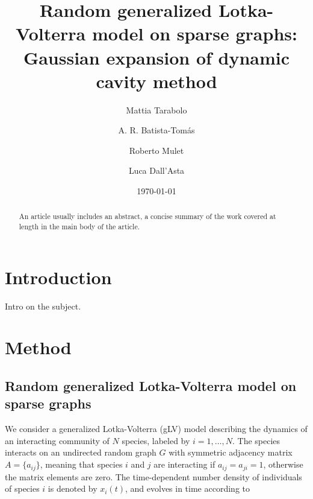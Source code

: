 \documentclass[
    preprint,
    linenumbers,
    amsmath,amssymb,amsfonts,
    aps, physrev,
    superscriptaddress,
    10pt,
    bibnotes
    ]{revtex4-2}
\begin{document}
\title{Random generalized Lotka-Volterra model on sparse graphs:\\
Gaussian expansion of dynamic cavity method}

\author{Mattia Tarabolo}

\author{A. R. Batista-Tomás}

\author{Roberto Mulet}

\author{Luca Dall'Asta}

\date{\today}

\begin{abstract}
An article usually includes an abstract, a concise summary of the
work covered at length in the main body of the article. 
\end{abstract}

\maketitle

\section{\label{sec:intro}Introduction}

Intro on the subject.

\section{Method}

\subsection{Random generalized Lotka-Volterra model on sparse graphs}

We consider a generalized Lotka-Volterra (gLV) model describing the dynamics
of an interacting community of $N$ species, labeled by $i=1,\dots,N$.
The species interacts on an undirected random graph $G$ with symmetric
adjacency matrix $A=\{a_{ij}\}$, meaning that species $i$ and $j$
are interacting if $a_{ij}=a_{ji}=1$, otherwise the matrix elements
are zero. The time-dependent number density of individuals of species
$i$ is denoted by $x_{i}(t)$, and evolves in time according to
\end{document}
